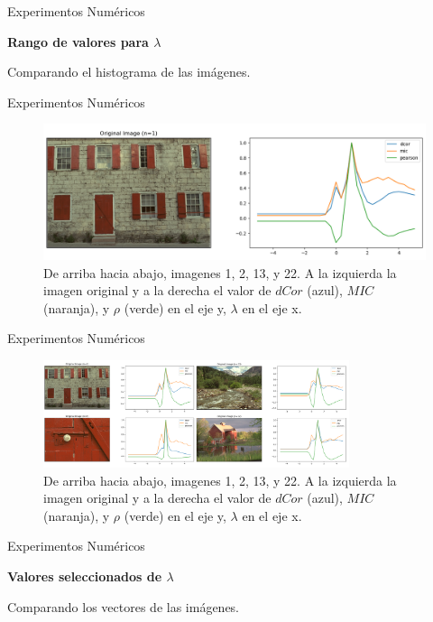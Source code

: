 \documentclass{beamer}
\begin{document}
\begin{frame}{Experimentos Numéricos}
    \begin{center}
        {\Large\bf Rango de valores para $\lambda$}
    \end{center}
    \pause

    \begin{center}
        {\Large  Comparando el histograma de las imágenes.}
    \end{center}
\end{frame}
\begin{frame}{Experimentos Numéricos}
    \begin{figure}[H]
        \centering
        \includegraphics[width=\textwidth]{lam_v_com_one_hist.png}
        \caption{De arriba hacia abajo, imagenes 1, 2, 13, y 22. A la izquierda la imagen original y a la derecha el valor de $dCor$ (azul), $MIC$ (naranja), y $\rho$ (verde) en el eje y, $\lambda$ en el eje x.}
    \end{figure}
\end{frame}

\begin{frame}{Experimentos Numéricos}
    \begin{figure}[H]
        \centering
        \includegraphics[width=0.8\textwidth]{lam_v_com_all_img_hist.png}
        \caption{De arriba hacia abajo, imagenes 1, 2, 13, y 22. A la izquierda la imagen original y a la derecha el valor de $dCor$ (azul), $MIC$ (naranja), y $\rho$ (verde) en el eje y, $\lambda$ en el eje x.}
    \end{figure}
\end{frame}

\begin{frame}{Experimentos Numéricos}
    \begin{center}
        {\Large\bf Valores seleccionados de $\lambda$}
    \end{center}
    \pause

    \begin{center}
        {\Large  Comparando los vectores de las imágenes.}
    \end{center}
\end{frame}
\end{document}

